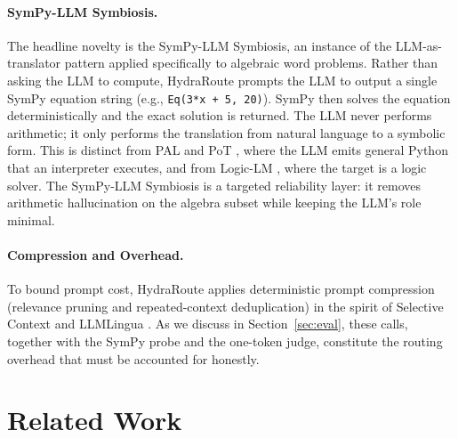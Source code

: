\documentclass[11pt]{article}
\newcommand{\system}{HydraRoute\xspace}
\begin{document}
\paragraph{SymPy-LLM Symbiosis.}
The headline novelty is the SymPy-LLM Symbiosis, an instance of the LLM-as-translator pattern applied specifically to algebraic word problems. Rather than asking the LLM to compute, \system prompts the LLM to output a single SymPy equation string (e.g., \texttt{Eq(3*x + 5, 20)}). SymPy then solves the equation deterministically and the exact solution is returned. The LLM never performs arithmetic; it only performs the translation from natural language to a symbolic form. This is distinct from PAL \cite{gao2022pal} and PoT \cite{chen2022pot}, where the LLM emits general Python that an interpreter executes, and from Logic-LM \cite{pan2023logiclm}, where the target is a logic solver. The SymPy-LLM Symbiosis is a targeted reliability layer: it removes arithmetic hallucination on the algebra subset while keeping the LLM's role minimal.

\paragraph{Compression and Overhead.}
To bound prompt cost, \system applies deterministic prompt compression (relevance pruning and repeated-context deduplication) in the spirit of Selective Context \cite{li2023selective} and LLMLingua \cite{jiang2023llmlingua,jiang2024llmlingua2}. As we discuss in Section~\ref{sec:eval}, these calls, together with the SymPy probe and the one-token judge, constitute the routing overhead that must be accounted for honestly.

\section{Related Work}
\label{sec:related}
\end{document}
